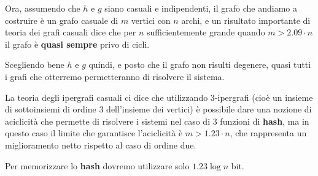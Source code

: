 \documentclass[\main/main.tex]{subfiles}
\begin{document}
\begin{analysis}
    Ora, assumendo che \(h\) e \(g\) siano casuali e indipendenti, il grafo che andiamo a costruire è un grafo casuale di \(m\) vertici con \(n\) archi, e un risultato importante di teoria dei grafi casuali dice che per \(n\) sufficientemente grande quando \(m > 2.09\cdot n\) il grafo è \textbf{quasi sempre} privo di cicli.
    
    Scegliendo bene \(h\) e \(g\) quindi, e posto che il grafo non risulti degenere, quasi tutti i grafi che otterremo permetteranno di risolvere il sistema.
    
    La teoria degli ipergrafi casuali ci dice che utilizzando \(3\)-ipergrafi (cioè un insieme di sottoinsiemi di ordine \(3\) dell'insieme dei vertici) è possibile dare una nozione di aciclicità che permette di risolvere i sistemi nel caso di \(3\) funzioni di \textbf{hash}, ma in questo caso il limite che garantisce l'aciclicità è \(m > 1.23 \cdot n\), che rappresenta un miglioramento netto rispetto al caso di ordine due.
    
    Per memorizzare lo \textbf{hash} dovremo utilizzare solo \(1.23 \log n\) bit.
\end{analysis}
\end{document}
